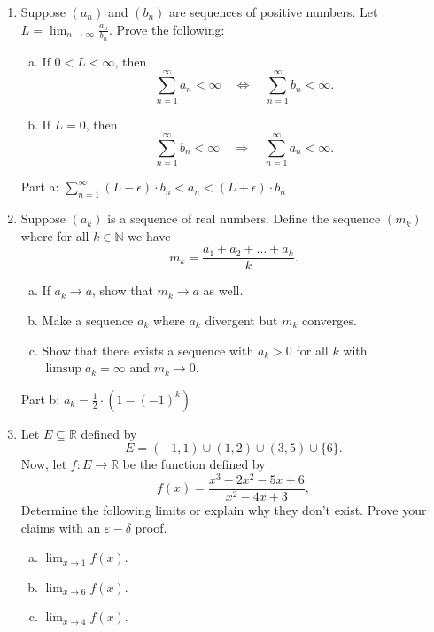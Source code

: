 \documentclass{amsart}
\begin{document}
\begin{enumerate}[1.]
\newpage
\item Suppose $(a_n)$ and $(b_n)$ are sequences of positive numbers. Let $\displaystyle L= \lim_{n\to\infty}\frac{a_n}{b_n}$. Prove the following:
\begin{enumerate}[(a)]
\item If $0<L<\infty$, then 
\[ \sum_{n=1}^{\infty} a_n < \infty \quad \Leftrightarrow \quad \sum_{n=1}^{\infty} b_n < \infty.\]
\item If $L=0$, then 
\[ \sum_{n=1}^{\infty} b_n < \infty \quad \Rightarrow \quad \sum_{n=1}^{\infty} a_n < \infty.\]
\end{enumerate}
Part a: $\sum_{n=1}^{\infty} (L - \epsilon)\cdot b_n < a_n < (L + \epsilon)\cdot b_n$

\newpage
\item Suppose $(a_k)$ is a sequence of real numbers. Define the sequence $(m_k)$ where for all $k \in \mathbb{N}$ we have
\[ m_k= \frac{a_1+a_2+\dots+ a_k}{k}.\]
\begin{enumerate}[(a)]
\item If $a_k \to a$, show that $m_k\to a$ as well.
\item Make a sequence $a_k$ where $a_k$ divergent but $m_k$ converges.
\item Show that there exists a sequence with $a_k>0$ for all $k$ with $\limsup a_k=\infty$ and $m_k\to 0.$
\end{enumerate}
Part b: $a_k = \frac{1}{2} \cdot (1 - (-1)^k)$


\newpage
\item Let $E \subseteq \mathbb{R}$ defined by 
\[ E = (-1,1) \cup (1,2) \cup (3,5) \cup \{6\}.\]
Now, let $f: E \to \mathbb{R}$ be the function defined by 
\[ f(x)=\frac{x^3-2x^2-5x+6}{x^2-4x+3},\]
Determine the following limits or explain why they don't exist. Prove your claims with an $\varepsilon-\delta$ proof. 
\begin{enumerate}[(a)]
\item $\displaystyle \lim_{x\to 1} f(x)$.
\item $\displaystyle \lim_{x\to 6} f(x)$.
\item $\displaystyle \lim_{x\to 4} f(x)$.
\end{enumerate}


\end{enumerate}
\end{document}
